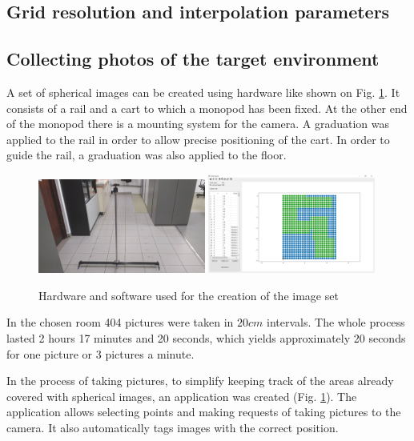 \documentclass{svproc}
\begin{document}
\subsection{Grid resolution and interpolation parameters}

\subsection{Collecting photos of the target environment}

A set of spherical images can be created using hardware like shown on Fig. \ref{fig:rig}.
It consists of a rail and a cart to which a monopod has been fixed.
At the other end of the monopod there is a mounting system for the camera.
A graduation was applied to the rail in order to allow precise positioning of the cart.
In order to guide the rail, a graduation was also applied to the floor.
\begin{figure}[!ht]
    \centering
    \includegraphics[width=0.49\textwidth]{img/rig/calosc.jpg}\hfill%
    \includegraphics[width=0.49\textwidth]{img/creator.png}\\
    \caption{Hardware and software used for the creation of the image set}
    \label{fig:rig}
\end{figure}

In the chosen room 404 pictures were taken in $20 cm$ intervals.
The whole process lasted 2 hours 17 minutes and 20 seconds, which yields approximately 20 seconds for 
one picture or 3 pictures a minute.

In the process of taking pictures, to simplify keeping track of the areas already covered with 
spherical images, an application was created (Fig. \ref{fig:rig}).
The application allows selecting points and making requests of taking pictures to the camera.
It also automatically tags images with the correct position.
\end{document}
